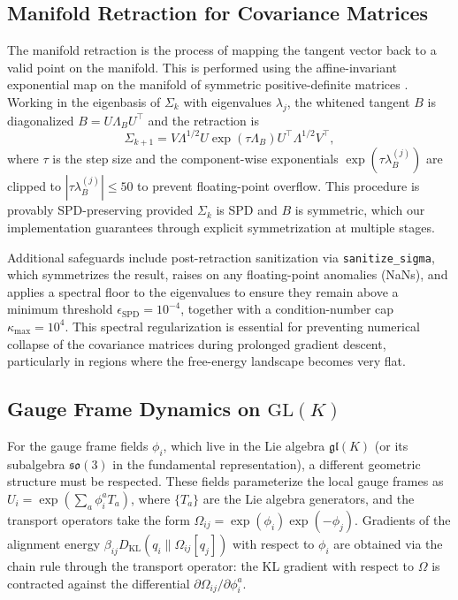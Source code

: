 \documentclass[twoside,11pt]{article}
\begin{document}
\subsection{Manifold Retraction for Covariance Matrices}\label{sec:retraction}
The manifold retraction is the process of mapping the tangent vector back to a valid point on the manifold. This is performed using the affine-invariant exponential map on the manifold of symmetric positive-definite matrices \citep{Pennec2006,Bhatia2007,Absil2008}. Working in the eigenbasis of $\Sigma_k$ with eigenvalues $\lambda_j$, the whitened tangent $B$ is diagonalized $B = U\Lambda_B U^\top$ and the retraction is
\begin{equation}
\Sigma_{k+1} = V \Lambda^{1/2} U \exp(\tau \Lambda_B) U^\top \Lambda^{1/2} V^\top,
\end{equation}
where $\tau$ is the step size and the component-wise exponentials $\exp(\tau \lambda_B^{(j)})$ are clipped to $|\tau \lambda_B^{(j)}| \le 50$ to prevent floating-point overflow. This procedure is provably SPD-preserving provided $\Sigma_k$ is SPD and $B$ is symmetric, which our implementation guarantees through explicit symmetrization at multiple stages.

Additional safeguards include post-retraction sanitization via
\texttt{sanitize\_sigma}, which symmetrizes the result, raises on any
floating-point anomalies (NaNs), and applies a spectral floor to the
eigenvalues to ensure they remain above a minimum threshold
$\epsilon_{\mathrm{SPD}} = 10^{-4}$, together with a condition-number cap
$\kappa_{\max} = 10^{4}$. This spectral regularization is essential for
preventing numerical collapse of the covariance matrices during prolonged
gradient descent, particularly in regions where the free-energy landscape
becomes very flat.

\subsection{Gauge Frame Dynamics on $\mathrm{GL}(K)$}
For the gauge frame fields $\phi_i$, which live in the Lie algebra $\mathfrak{gl}(K)$ (or its subalgebra $\mathfrak{so}(3)$ in the fundamental representation), a different geometric structure must be respected. These fields parameterize the local gauge frames as $U_i = \exp(\sum_a \phi_i^a T_a)$, where $\{T_a\}$ are the Lie algebra generators, and the transport operators take the form $\Omega_{ij} = \exp(\phi_i)\exp(-\phi_j)$. Gradients of the alignment energy $\beta_{ij} D_{\mathrm{KL}}(q_i \| \Omega_{ij}[q_j])$ with respect to $\phi_i$ are obtained via the chain rule through the transport operator: the KL gradient with respect to $\Omega$ is contracted against the differential $\partial\Omega_{ij}/\partial\phi_i^a$.
\end{document}
